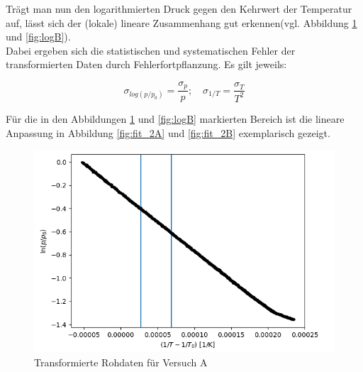 \documentclass[12pt,a4paper]{article}
\begin{document}
Trägt man nun den logarithmierten Druck gegen den Kehrwert der Temperatur auf, lässt sich der (lokale) lineare Zusammenhang gut erkennen(vgl. Abbildung \ref{fig:logA} und \ref{fig:logB}).\\

Dabei ergeben sich die statistischen und systematischen Fehler der transformierten Daten durch Fehlerfortpflanzung. Es gilt jeweils:

\begin{equation}
\sigma_{log(p/p_0)}=\frac{\sigma_p}{p} ; \quad \sigma_{1/T}=\frac{\sigma_T}{T^2}
\end{equation}

Für die in den Abbildungen \ref{fig:logA} und \ref{fig:logB} markierten Bereich ist die lineare Anpassung in Abbildung \ref{fig:fit_2A} und \ref{fig:fit_2B} exemplarisch gezeigt.\\

\begin{figure}[H]
\includegraphics[width=\linewidth]{Bilder/log_RohdatenA.png}
\caption[Transformierte Daten A]{Transformierte Rohdaten für Versuch A}
\label{fig:logA}
\end{figure}
\end{document}
